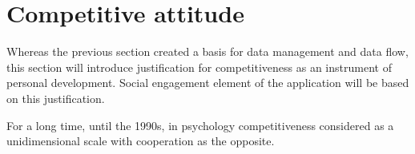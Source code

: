 
\section{Competitive attitude}\label{sec:competitive-attitude}



Whereas the previous section created a basis for data management and data flow,
this section will introduce justification for competitiveness as an instrument of personal development.
Social engagement element of the application will be based on this justification.

For a long time, until the 1990s, in psychology competitiveness considered as a unidimensional scale with cooperation as the opposite.
